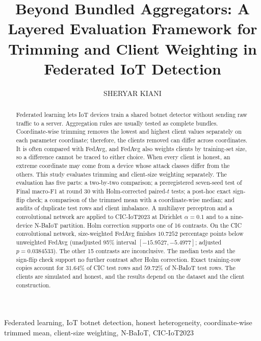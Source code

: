 \documentclass{ieeeaccess}
\begin{document}

\title{Beyond Bundled Aggregators: A Layered Evaluation Framework for Trimming and Client Weighting in Federated IoT Detection}
\author{\uppercase{Sheryar Kiani}}
\address[1]{Department of Cyber Security, Air University, Islamabad, Pakistan (e-mail: 2504142@students.au.edu.pk)}

\begin{abstract}
Federated learning lets IoT devices train a shared botnet detector without sending raw traffic to a server. Aggregation rules are usually tested as complete bundles. Coordinate-wise trimming removes the lowest and highest client values separately on each parameter coordinate; therefore, the clients removed can differ across coordinates. It is often compared with FedAvg, and FedAvg also weights clients by training-set size, so a difference cannot be traced to either choice. When every client is honest, an extreme coordinate may come from a device whose attack classes differ from the others. This study evaluates trimming and client-size weighting separately. The evaluation has five parts: a two-by-two comparison; a preregistered seven-seed test of Final macro-F1 at round 30 with Holm-corrected paired-$t$ tests; a post-hoc exact sign-flip check; a comparison of the trimmed mean with a coordinate-wise median; and audits of duplicate test rows and client imbalance. A multilayer perceptron and a convolutional network are applied to CIC-IoT2023 at Dirichlet $\alpha=0.1$ and to a nine-device N-BaIoT partition. Holm correction supports one of 16 contrasts. On the CIC convolutional network, size-weighted FedAvg finishes $10.7252$ percentage points below unweighted FedAvg (unadjusted 95\% interval $[-15.9527,-5.4977]$; adjusted $p=0.0384533$). The other 15 contrasts are inconclusive. The median tests and the sign-flip check support no further contrast after Holm correction. Exact training-row copies account for $31.64\%$ of CIC test rows and $59.72\%$ of N-BaIoT test rows. The clients are simulated and honest, and the results depend on the dataset and the client construction.
\end{abstract}

\begin{keywords}
Federated learning, IoT botnet detection, honest heterogeneity, coordinate-wise trimmed mean, client-size weighting, N-BaIoT, CIC-IoT2023
\end{keywords}
\end{document}
